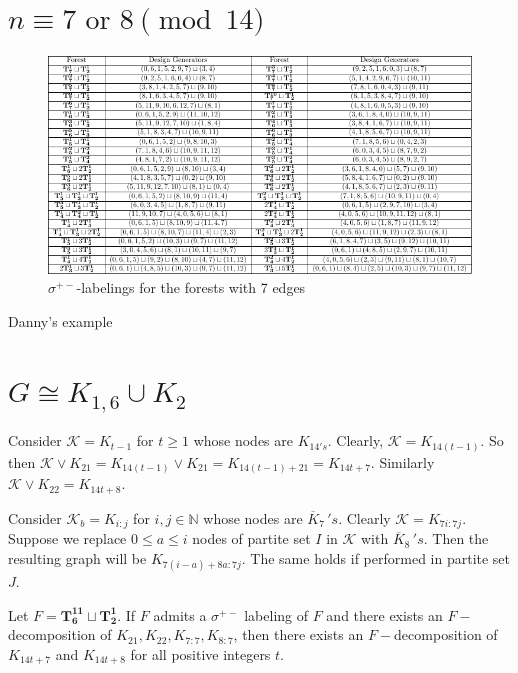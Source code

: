 \documentclass{dmgt}
\begin{document}
\section{$n \equiv 7 \textrm{ or } 8 \pmod{14}$} \label{sec:7 or 8 mod 14}
\begin{figure}[H]
    \centering
    \includegraphics[scale=1.1]{0,1(mod 14).pdf}
    \caption{$\sigma^{+-}$-labelings for the forests with 7 edges}
    \label{fig:enter-label}
\end{figure}

\begin{exm}
    Danny's example
\end{exm}
\section{$ G \cong K_{1,6} \cup K_2$}

\begin{obs} \label{obs:K_n spec constr}
    Consider $\mathcal{K}=K_{t-1}$ for $t\geq 1$ whose nodes are $K_{14's}$. Clearly, $\mathcal{K}=K_{14(t-1)}$. So then $\mathcal{K}\lor K_{21}=K_{14(t-1)}\lor K_{21}=K_{14(t-1)+21}=K_{14t+7}$. Similarly $\mathcal{K}\lor K_{22}=K_{14t+8}$.
\end{obs}

\begin{obs}\label{obs:K_i,j spec constr}
    Consider $\mathcal{K}_{b}=K_{i:j}$ for $i,j\in \mathbb{N}$ whose nodes are $\overline{K}_{7}\,'s$. Clearly $\mathcal{K}=K_{7i:7j}$. Suppose we replace $0 \leq a\leq i$ nodes of partite set $I$ in $\mathcal{K}$ with $\overline{K}_{8}\,'s$. Then the resulting graph will be $K_{7(i-a)+8a:7j}$. The same holds if performed in partite set $J$.
\end{obs}

\begin{theorem}
Let $F=\mathbf{T_{6}^{11}}\sqcup\mathbf{T_{2}^{1}}$. If $F$ admits a $\sigma^{+-}$ labeling of $F$ and there exists an $F-$decomposition of $K_{21},K_{22},K_{7:7},K_{8:7}$, then there exists an $F-$decomposition of $K_{14t+7}$ and $K_{14t+8}$ for all positive integers $t$.
\end{theorem}
\end{document}
